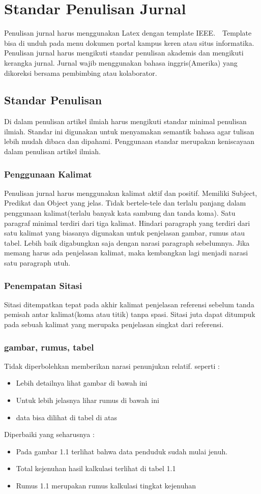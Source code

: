 \chapter{Standar Penulisan Jurnal}

Penulisan jurnal harus menggunakan Latex dengan template IEEE.　Template bisa di unduh pada menu dokumen portal kampus keren atau situs informatika. Penulisan jurnal harus mengikuti standar penulisan akademis dan mengikuti kerangka jurnal. Jurnal wajib menggunakan bahasa inggris(Amerika) yang dikoreksi bersama pembimbing atau kolaborator. 

\section{Standar Penulisan}
Di dalam penulisan artikel ilmiah harus mengikuti standar minimal penulisan ilmiah. Standar ini digunakan untuk menyamakan semantik bahasa agar tulisan lebih mudah dibaca dan dipahami. Penggunaan standar merupakan keniscayaan dalam penulisan artikel ilmiah.
\subsection{Penggunaan Kalimat}
Penulisan jurnal harus menggunakan kalimat aktif dan positif. Memiliki Subject, Predikat dan Object yang jelas. Tidak bertele-tele dan terlalu panjang dalam penggunaan kalimat(terlalu banyak kata sambung dan tanda koma). Satu paragraf minimal terdiri dari tiga kalimat. Hindari paragraph yang terdiri dari satu kalimat yang biasanya digunakan untuk penjelasan gambar, rumus atau tabel. Lebih baik digabungkan saja dengan narasi paragraph sebelumnya. Jika memang harus ada penjelasan kalimat, maka kembangkan lagi menjadi narasi satu paragraph utuh.
\subsection{Penempatan Sitasi}
Sitasi ditempatkan tepat pada akhir kalimat penjelasan referensi sebelum tanda pemisah antar kalimat(koma atau titik) tanpa spasi. Sitasi juta dapat ditumpuk pada sebuah kalimat yang merupaka  penjelasan singkat dari referensi. 
\subsection{gambar, rumus, tabel}
Tidak diperbolehkan memberikan narasi penunjukan relatif. seperti :
\begin{itemize}
	\item Lebih detailnya lihat gambar di bawah ini
	\item Untuk lebih jelasnya lihar rumus di bawah ini
	\item data bisa dilihat di tabel di atas
\end{itemize}
Diperbaiki yang seharusnya :
\begin{itemize}
	\item Pada gambar 1.1 terlihat bahwa data penduduk sudah mulai jenuh.
	\item Total kejenuhan hasil kalkulasi terlihat di tabel 1.1
	\item Rumus 1.1 merupakan rumus kalkulasi tingkat kejenuhan
\end{itemize}

